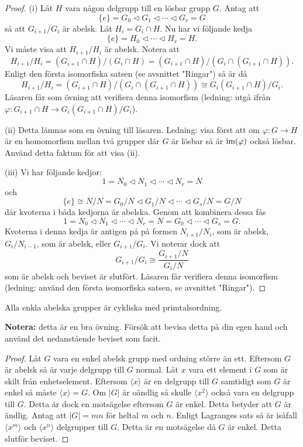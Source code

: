 \documentclass{article}
\newcommand{\im}[0]{\textnormal{im}}
\theoremstyle{definition}
\begin{document}
\begin{proof}
  (i) Låt $H$ vara någon delgrupp till en lösbar grupp $G$. 
  Antag att 
  \[\{e\} = G_0 \triangleleft G_1 \triangleleft \cdots \triangleleft G_r = G\]
  så att $G_{i+1}/G_i$ är abelsk. Låt $H_i = G_i \cap H$. Nu har vi följande kedja 
  \[\{e\} = H_0 \triangleleft \cdots \triangleleft H_r = H.\]
  Vi måste visa att $H_{i+1}/H_i$ är abelsk. Notera att 
  \[H_{i+1}/H_i = (G_{i+1} \cap H)/(G_i \cap H) = (G_{i+1} \cap H)/(G_i \cap (G_{i+1} \cap H)).\]
  Enligt den första isomorfiska satsen (se avsnittet "Ringar") så är då 
  \[H_{i+1}/H_i = (G_{i+1} \cap H)/(G_i \cap (G_{i+1} \cap H)) \cong G_i(G_{i+1} \cap H)/G_i.\]
  Läsaren får som övning att verifiera denna isomorfism (ledning: utgå ifrån $\varphi: G_{i+1} \cap H \rightarrow G_i(G_{i+1} \cap H)/G_i$).

  (ii) Detta lämnas som en övning till läsaren. Ledning: visa först att om $\varphi: G \rightarrow H$ är en homomorfism
  mellan två grupper där $G$ är lösbar så är $\im(\varphi)$ också lösbar. Använd detta faktum för att visa (ii).

  (iii) Vi har följande kedjor: 
  \[1 = N_0 \triangleleft N_1 \triangleleft \cdots \triangleleft N_r = N\]
  och 
  \[\{e\} \cong N/N = G_0/N \triangleleft G_1/N \triangleleft \cdots \triangleleft G_s/N = G/N\]
  där kvoterna i båda kedjorna är abelska. Genom att kombinera dessa fås 
  \[1 = N_0 \triangleleft N_1 \triangleleft \cdots \triangleleft N_r = N = G_0 \triangleleft \cdots \triangleleft G_s = G.\]
  Kvoterna i denna kedja är antigen på på formen $N_{i+1}/N_i$, som är abelsk, $G_i/N_{i-1}$, som är abelsk, eller $G_{i+1}/G_i$. Vi noterar 
  dock att 
  \[G_{i+1}/G_i \cong \frac{G_{i+1}/N}{G_i/N}\]
  som är abelsk och beviset är slutfört. Läsaren får verifiera denna isomorfism (ledning: använd den första isomorfiska satsen, se avsnittet "Ringar").
\end{proof}

\begin{mylemma}{}{}
  Alla enkla abelska grupper är cykliska med primtalsordning.
\end{mylemma}

\textbf{Notera:} detta är en bra övning. Försök att bevisa detta på din egen hand och använd det nedanstående beviset 
som facit.

\begin{proof}
  Låt $G$ vara en enkel abelsk grupp med ordning större än ett. Eftersom $G$ är abelsk så är varje delgrupp till $G$ normal. Låt $x$ vara 
  ett element i $G$ som är skilt från enhetselement. Eftersom $\langle x \rangle$ är en delgrupp till $G$ samtidigt som $G$ är enkel så måste 
  $\langle x \rangle = G$. Om $|G|$ är oändlig så skulle $\langle x^2 \rangle$ också vara en delgrupp till $G$. Detta är dock en motsägelse
  eftersom $G$ är enkel. Detta betyder att $G$ är ändlig. Antag att $|G| = mn$ för heltal $m$ och $n$. Enligt Lagranges sats så 
  är isåfall $\langle x^m \rangle$ och $\langle x^n \rangle$ delgrupper till $G$. Detta är en motsägelse då $G$ är enkel. Detta slutför beviset.
\end{proof}
\end{document}
